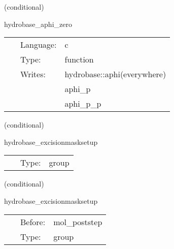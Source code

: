 \vspace{5mm}

   (conditional) 

\hspace{5mm} hydrobase\_aphi\_zero 

\hspace{5mm}{\it set vector potential phi to 0 } 


\hspace{5mm}

 \begin{tabular*}{160mm}{cll} 
~ & Language:  & c \\ 
~ & Type:  & function \\ 
~ & Writes:  & hydrobase::aphi(everywhere) \\ 
~& ~ &aphi\_p\\ 
~& ~ &aphi\_p\_p\\ 
\end{tabular*} 


\vspace{5mm}

   (conditional) 

\hspace{5mm} hydrobase\_excisionmasksetup 

\hspace{5mm}{\it set up hydro excision mask } 


\hspace{5mm}

 \begin{tabular*}{160mm}{cll} 
~ & Type:  & group \\ 
\end{tabular*} 


\vspace{5mm}

   (conditional) 

\hspace{5mm} hydrobase\_excisionmasksetup 

\hspace{5mm}{\it set up hydro excision mask } 


\hspace{5mm}

 \begin{tabular*}{160mm}{cll} 
~ & Before:  & mol\_poststep \\ 
~ & Type:  & group \\ 
\end{tabular*} 


